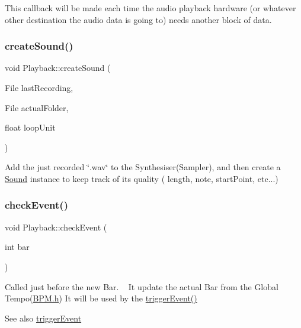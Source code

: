 This callback will be made each time the audio playback hardware (or whatever other destination the audio data is going to) needs another block of data. \mbox{\label{class_playback_a7a9305b20478e6341b5e642a9430106a}} 
\subsubsection{\texorpdfstring{createSound()}{createSound()}}
{\footnotesize\ttfamily void Playback\+::create\+Sound (\begin{DoxyParamCaption}\item[{File}]{last\+Recording,  }\item[{File}]{actual\+Folder,  }\item[{float}]{loop\+Unit }\end{DoxyParamCaption})}

Add the just recorded \char`\"{}.\+wav\char`\"{} to the Synthesiser(\+Sampler), and then create a \mbox{\hyperlink{class_sound}{Sound}} instance to keep track of its quality ( length, note, start\+Point, etc...) \mbox{\label{class_playback_af7732d93fe617e0b1d2c82b1f7c949f3}} 
\subsubsection{\texorpdfstring{checkEvent()}{checkEvent()}}
{\footnotesize\ttfamily void Playback\+::check\+Event (\begin{DoxyParamCaption}\item[{int}]{bar }\end{DoxyParamCaption})}

Called just before the new Bar. ~\newline
 It update the actual Bar from the Global Tempo(\mbox{\hyperlink{_b_p_m_8h_source}{B\+P\+M.\+h}}) It will be used by the \mbox{\hyperlink{class_playback_a760402c6c68ba6fe5b154ec0d19c3b25}{trigger\+Event()}} \begin{DoxySeeAlso}{See also}
\mbox{\hyperlink{class_playback_a760402c6c68ba6fe5b154ec0d19c3b25}{trigger\+Event}} 
\end{DoxySeeAlso}
\mbox{\label{class_playback_a760402c6c68ba6fe5b154ec0d19c3b25}} 
